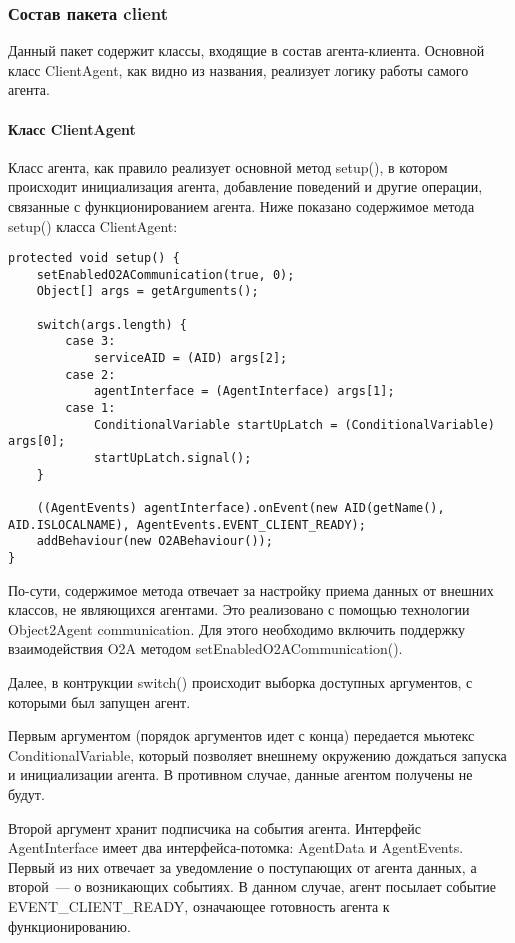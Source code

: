 \subsubsection{Состав пакета client}
Данный пакет содержит классы, входящие в состав агента-клиента. Основной класс ClientAgent, как видно из названия, реализует логику работы самого агента.

\paragraph{Класс ClientAgent}
Класс агента, как правило реализует основной метод setup(), в котором происходит инициализация агента, добавление поведений и другие операции, связанные с функционированием агента.
Ниже показано содержимое метода setup() класса ClientAgent:
\begin{lstlisting}
protected void setup() {
    setEnabledO2ACommunication(true, 0);
    Object[] args = getArguments();

    switch(args.length) {
        case 3:
            serviceAID = (AID) args[2];
        case 2:
            agentInterface = (AgentInterface) args[1];
        case 1:
            ConditionalVariable startUpLatch = (ConditionalVariable) args[0];
            startUpLatch.signal();
    }

    ((AgentEvents) agentInterface).onEvent(new AID(getName(), AID.ISLOCALNAME), AgentEvents.EVENT_CLIENT_READY);
    addBehaviour(new O2ABehaviour());
}
\end{lstlisting}
По-сути, содержимое метода отвечает за настройку приема данных от внешних классов, не являющихся агентами. Это реализовано с помощью технологии Object2Agent communication. Для этого необходимо включить поддержку взаимодействия O2A методом setEnabledO2ACommunication().

Далее, в контрукции switch() происходит выборка доступных аргументов, с которыми был запущен агент.

Первым аргументом (порядок аргументов идет с конца) передается мьютекс ConditionalVariable, который позволяет внешнему окружению дождаться запуска и инициализации агента. В противном случае, данные агентом получены не будут.

Второй аргумент хранит подписчика на события агента. Интерфейс AgentInterface имеет два интерфейса-потомка: AgentData и AgentEvents. Первый из них отвечает за уведомление о поступающих от агента данных, а второй~--- о возникающих событиях. В данном случае, агент посылает событие EVENT\_CLIENT\_READY, означающее готовность агента к функционированию.

